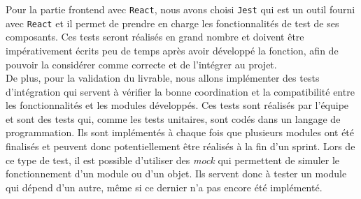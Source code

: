 \documentclass{article}
\begin{document}
Pour la partie frontend avec \texttt{React}, nous avons choisi \texttt{Jest} qui est un outil fourni avec \texttt{React} %
et il permet de prendre en charge les fonctionnalités de test de ses composants. %
Ces tests seront réalisés en grand nombre et doivent être impérativement écrits peu de temps après avoir développé la fonction, afin de pouvoir la considérer comme correcte et de l'intégrer au projet. \\

De plus, pour la validation du livrable, nous allons implémenter des tests d'intégration qui servent à vérifier la bonne coordination et la compatibilité entre les fonctionnalités et les modules développés. 
Ces tests sont réalisés par l'équipe et sont des tests qui, comme les tests unitaires, sont codés dans un langage de programmation.
Ils sont implémentés à chaque fois que plusieurs modules ont été finalisés et peuvent donc potentiellement être réalisés à la fin d'un sprint.
Lors de ce type de test, il est possible d'utiliser des \textit{mock} qui permettent de simuler le fonctionnement d'un module ou d'un objet. Ils servent donc à tester un module qui dépend d'un autre, même si ce 
dernier n'a pas encore été implémenté.\\
\end{document}
